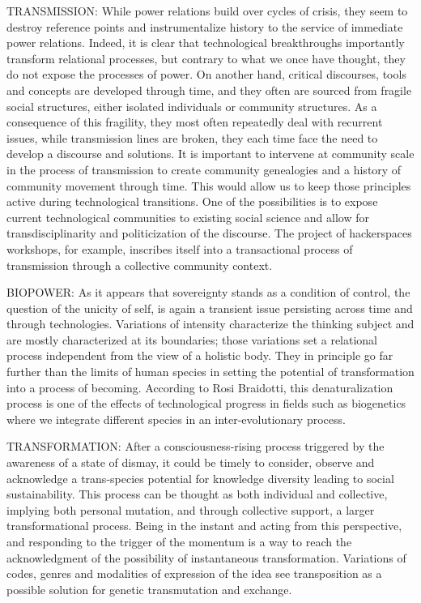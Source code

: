 TRANSMISSION: While power relations build over cycles of crisis, they
seem to destroy reference points and instrumentalize history to the
service of immediate power relations. Indeed, it is clear that
technological breakthroughs importantly transform relational processes,
but contrary to what we once have thought, they do not expose the
processes of power. On another hand, critical discourses, tools and
concepts are developed through time, and they often are sourced from
fragile social structures, either isolated individuals or community
structures. As a consequence of this fragility, they most often
repeatedly deal with recurrent issues, while transmission lines are
broken, they each time face the need to develop a discourse and
solutions. It is important to intervene at community scale in the
process of transmission to create community genealogies and a history of
community movement through time. This would allow us to keep those
principles active during technological transitions. One of the
possibilities is to expose current technological communities to existing
social science and allow for transdisciplinarity and politicization of
the discourse. The project of hackerspaces workshops, for example,
inscribes itself into a transactional process of transmission through a
collective community context.

BIOPOWER: As it appears that sovereignty stands as a condition of
control, the question of the unicity of self, is again a transient issue
persisting across time and through technologies. Variations of intensity
characterize the thinking subject and are mostly characterized at its
boundaries; those variations set a relational process independent from
the view of a holistic body. They in principle go far further than the
limits of human species in setting the potential of transformation into
a process of becoming. According to Rosi Braidotti, this
denaturalization process is one of the effects of technological progress
in fields such as biogenetics where we integrate different species in an
inter-evolutionary process.

TRANSFORMATION: After a consciousness-rising process triggered by the
awareness of a state of dismay, it could be timely to consider, observe
and acknowledge a trans-species potential for knowledge diversity
leading to social sustainability. This process can be thought as both
individual and collective, implying both personal mutation, and through
collective support, a larger transformational process. Being in the
instant and acting from this perspective, and responding to the trigger
of the momentum is a way to reach the acknowledgment of the possibility
of instantaneous transformation. Variations of codes, genres and
modalities of expression of the idea see transposition as a possible
solution for genetic transmutation and exchange.
